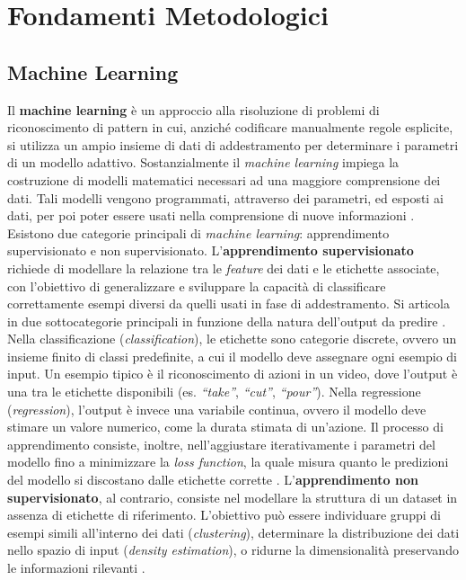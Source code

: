 \chapter{Fondamenti Metodologici}
\label{cap2}
\section{Machine Learning}
Il \textbf{machine learning} è un approccio alla risoluzione di problemi di riconoscimento di pattern in cui, anziché codificare manualmente regole esplicite, si utilizza un ampio insieme di dati di addestramento per determinare i parametri di un modello adattivo. Sostanzialmente il \textit{machine learning} impiega la costruzione di modelli matematici necessari ad una maggiore comprensione dei dati. Tali modelli vengono programmati, attraverso dei parametri, ed esposti ai dati, per poi poter essere usati nella comprensione di nuove informazioni \cite{vanderplas2016python}. 
Esistono due categorie principali di \textit{machine learning}: apprendimento supervisionato e non supervisionato.
L'\textbf{apprendimento supervisionato} richiede di modellare la relazione tra le \textit{feature} dei dati e le etichette associate, con l'obiettivo di generalizzare e sviluppare la capacità di classificare correttamente esempi diversi da quelli usati in fase di addestramento.
Si articola in due sottocategorie principali in funzione della natura dell'output da predire \cite{bishop2006pattern}. Nella classificazione (\textit{classification}), le etichette sono categorie discrete, ovvero un insieme finito di classi predefinite, a cui il modello deve assegnare ogni esempio di input. Un esempio tipico è il riconoscimento di azioni in un video, dove l'output è una tra le etichette disponibili (es. \textit{``take''}, \textit{``cut''}, \textit{``pour''}). Nella regressione (\textit{regression}), l'output è invece una variabile continua, ovvero il modello deve stimare un valore numerico, come la durata stimata di un'azione.
Il processo di apprendimento consiste, inoltre, nell'aggiustare iterativamente i parametri del modello fino a minimizzare la \textit{loss function}, la quale misura quanto le predizioni del modello si discostano dalle etichette corrette \cite{bishop2006pattern}.
L'\textbf{apprendimento non supervisionato}, al contrario, consiste nel modellare la struttura di un dataset in assenza di etichette di riferimento. L'obiettivo può essere individuare gruppi di esempi simili all'interno dei dati (\textit{clustering}), determinare la distribuzione dei dati nello spazio di input (\textit{density estimation}), o ridurne la dimensionalità preservando le informazioni rilevanti \cite{bishop2006pattern}.
